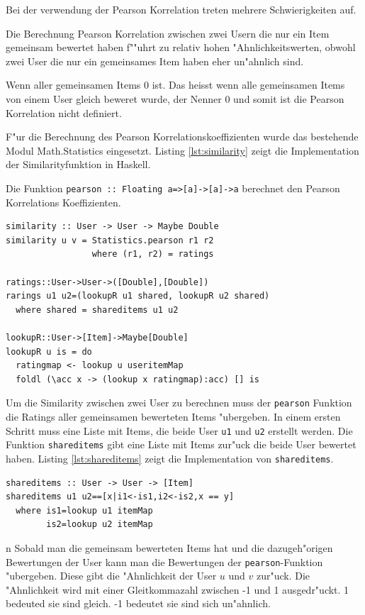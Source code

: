 \documentclass[a4paper, 12pt]{article}
\begin{document}
Bei der verwendung der Pearson Korrelation treten mehrere Schwierigkeiten auf.

Die Berechnung Pearson Korrelation zwischen zwei Usern die nur ein Item gemeinsam bewertet haben f""uhrt zu relativ hohen "Ahnlichkeitswerten, obwohl zwei User die nur ein gemeinsames Item haben eher un"ahnlich sind.

Wenn aller gemeinsamen Items 0 ist. Das heisst wenn alle gemeinsamen Items von einem User gleich beweret wurde, der Nenner 0 und somit ist die Pearson Korrelation nicht definiert.

F"ur die Berechnung des Pearson Korrelationskoeffizienten wurde das bestehende Modul Math.Statistics eingesetzt. Listing \ref{lst:similarity} zeigt die Implementation der Similarityfunktion in Haskell.

Die Funktion \verb|pearson :: Floating a=>[a]->[a]->a| berechnet den Pearson Korrelations Koeffizienten.

\begin{lstlisting}[caption=Similarity, label=lst:similarity]
similarity :: User -> User -> Maybe Double
similarity u v = Statistics.pearson r1 r2
                 where (r1, r2) = ratings

ratings::User->User->([Double],[Double])
rarings u1 u2=(lookupR u1 shared, lookupR u2 shared)
  where shared = shareditems u1 u2

lookupR::User->[Item]->Maybe[Double]
lookupR u is = do
  ratingmap <- lookup u useritemMap
  foldl (\acc x -> (lookup x ratingmap):acc) [] is
\end{lstlisting}

Um die Similarity zwischen zwei User zu berechnen muss der \verb|pearson| Funktion die Ratings aller gemeinsamen bewerteten Items "ubergeben. In einem ersten Schritt muss eine Liste mit Items, die beide User \verb|u1| und \verb|u2| erstellt werden. Die Funktion \verb|shareditems| gibt eine Liste mit Items zur"uck die beide User bewertet haben. Listing \ref{lst:shareditems} zeigt die Implementation von \verb|shareditems|.

\begin{lstlisting}[caption=shareditems, label=lst:shareditems]
shareditems :: User -> User -> [Item]
shareditems u1 u2==[x|i1<-is1,i2<-is2,x == y]
  where is1=lookup u1 itemMap
        is2=lookup u2 itemMap
\end{lstlisting}
n
Sobald man die gemeinsam bewerteten Items hat und die dazugeh"origen Bewertungen der User kann man die Bewertungen der \verb|pearson|-Funktion "ubergeben. Diese gibt die "Ahnlichkeit der User $u$ und $v$ zur"uck. Die "Ahnlichkeit wird mit einer Gleitkommazahl zwischen -1 und 1 ausgedr"uckt. 1 bedeuted sie sind gleich. -1 bedeutet sie sind sich un"ahnlich.
\end{document}
